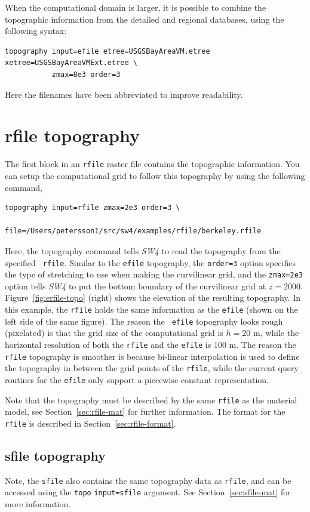 \documentclass[11pt]{report}
\begin{document}
When the computational domain is larger, it is possible to combine the topographic information from
the detailed and regional databases, using the following syntax:
\begin{verbatim}
topography input=efile etree=USGSBayAreaVM.etree xetree=USGSBayAreaVMExt.etree \
           zmax=8e3 order=3
\end{verbatim}
Here the filenames have been abbreviated to improve readability.

\section{rfile topography}\label{sec:topo-rfile}

The first block in an \verb+rfile+ raster file contains the topographic
information. You can setup the computational grid to follow this topography by using the following command,
\begin{verbatim}
topography input=rfile zmax=2e3 order=3 \
           file=/Users/petersson1/src/sw4/examples/rfile/berkeley.rfile
\end{verbatim}
Here, the topography command tells \emph{SW4} to read the topography from the specified {\tt
  rfile}. Similar to the {\tt efile} topography, the \verb+order=3+ option specifies the type of
stretching to use when making the curvilinear grid, and the \verb+zmax=2e3+ option tells \emph{SW4}
to put the bottom boundary of the curvilinear grid at $z=2000$. Figure~\ref{fig:erfile-topo} (right)
shows the elevation of the resulting topography. In this example, the {\tt rfile} holds the same
information as the {\tt efile} (shown on the left side of the same figure). The reason the {\tt
  efile} topography looks rough (pixelated) is that the grid size of the computational grid is
$h=20$ m, while the horizontal resolution of both the {\tt rfile} and the {\tt efile} is 100 m. The
reason the {\tt rfile} topography is smoother is because bi-linear interpolation is used to define
the topography in between the grid points of the {\tt rfile}, while the current query routines for
the {\tt efile} only support a piecewise constant representation.

Note that the topography must be described by the same {\tt rfile} as the material model, see
Section~\ref{sec:rfile-mat} for further information. The format
for the \verb+rfile+ is described in Section~\ref{sec:rfile-format}. 

\subsection{sfile topography}\label{sec:topo-sfile}
Note, the \verb+sfile+ also contains the same topography data as 
  \verb+rfile+, and can be accessed using the \verb+topo+ \verb+input=sfile+
  argument.
See Section~\ref{sec:sfile-mat} for more information.
\end{document}
